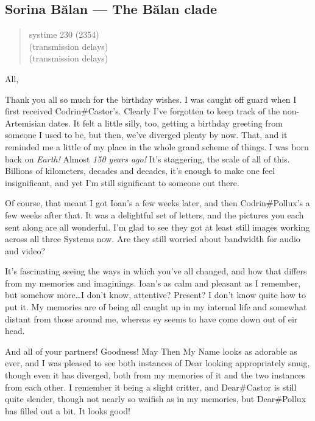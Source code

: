 \hypertarget{sorina-bux103lan-the-bux103lan-clade}{%
\subsection{Sorina Bălan — The Bălan clade}\label{sorina-bux103lan-the-bux103lan-clade}}

\begin{quote}
systime 230 (2354)\\
(transmission delays)\\
(transmission delays)
\end{quote}

All,

Thank you all so much for the birthday wishes. I was caught off guard when I first received Codrin\#Castor's. Clearly I've forgotten to keep track of the non-Artemisian dates. It felt a little silly, too, getting a birthday greeting from someone I used to be, but then, we've diverged plenty by now. That, and it reminded me a little of my place in the whole grand scheme of things. I was born back on \emph{Earth!} Almost \emph{150 years ago!} It's staggering, the scale of all of this. Billions of kilometers, decades and decades, it's enough to make one feel insignificant, and yet I'm still significant to someone out there.

Of course, that meant I got Ioan's a few weeks later, and then Codrin\#Pollux's a few weeks after that. It was a delightful set of letters, and the pictures you each sent along are all wonderful. I'm glad to see they got at least still images working across all three Systems now. Are they still worried about bandwidth for audio and video?

It's fascinating seeing the ways in which you've all changed, and how that differs from my memories and imaginings. Ioan's as calm and pleasant as I remember, but somehow more\ldots{}I don't know, attentive? Present? I don't know quite how to put it. My memories are of being all caught up in my internal life and somewhat distant from those around me, whereas ey seems to have come down out of eir head.

And all of your partners! Goodness! May Then My Name looks as adorable as ever, and I was pleased to see both instances of Dear looking appropriately smug, though even it has diverged, both from my memories of it and the two instances from each other. I remember it being a slight critter, and Dear\#Castor is still quite slender, though not nearly so waifish as in my memories, but Dear\#Pollux has filled out a bit. It looks good!

